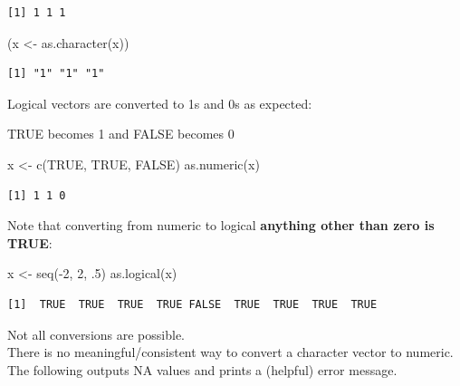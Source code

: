 \documentclass[
]{book}
\newenvironment{Shaded}{\begin{snugshade}}{\end{snugshade}}
\newcommand{\ConstantTok}[1]{\textcolor[rgb]{0.00,0.00,0.00}{#1}}
\newcommand{\DecValTok}[1]{\textcolor[rgb]{0.00,0.00,0.81}{#1}}
\newcommand{\FunctionTok}[1]{\textcolor[rgb]{0.00,0.00,0.00}{#1}}
\newcommand{\NormalTok}[1]{#1}
\newcommand{\OtherTok}[1]{\textcolor[rgb]{0.56,0.35,0.01}{#1}}
\newcommand{\SpecialCharTok}[1]{\textcolor[rgb]{0.00,0.00,0.00}{#1}}
\begin{document}
\begin{verbatim}
[1] 1 1 1
\end{verbatim}

\begin{Shaded}
\begin{Highlighting}[]
\NormalTok{(x }\OtherTok{\textless{}{-}} \FunctionTok{as.character}\NormalTok{(x))}
\end{Highlighting}
\end{Shaded}

\begin{verbatim}
[1] "1" "1" "1"
\end{verbatim}

Logical vectors are converted to 1s and 0s as expected:

TRUE becomes 1 and FALSE becomes 0

\begin{Shaded}
\begin{Highlighting}[]
\NormalTok{x }\OtherTok{\textless{}{-}} \FunctionTok{c}\NormalTok{(}\ConstantTok{TRUE}\NormalTok{, }\ConstantTok{TRUE}\NormalTok{, }\ConstantTok{FALSE}\NormalTok{)}
\FunctionTok{as.numeric}\NormalTok{(x)}
\end{Highlighting}
\end{Shaded}

\begin{verbatim}
[1] 1 1 0
\end{verbatim}

Note that converting from numeric to logical \textbf{anything other than zero is TRUE}:

\begin{Shaded}
\begin{Highlighting}[]
\NormalTok{x }\OtherTok{\textless{}{-}} \FunctionTok{seq}\NormalTok{(}\SpecialCharTok{{-}}\DecValTok{2}\NormalTok{, }\DecValTok{2}\NormalTok{, .}\DecValTok{5}\NormalTok{)}
\FunctionTok{as.logical}\NormalTok{(x)}
\end{Highlighting}
\end{Shaded}

\begin{verbatim}
[1]  TRUE  TRUE  TRUE  TRUE FALSE  TRUE  TRUE  TRUE  TRUE
\end{verbatim}

Not all conversions are possible.\\
There is no meaningful/consistent way to convert a character vector to numeric.\\
The following outputs NA values and prints a (helpful) error message.
\end{document}
